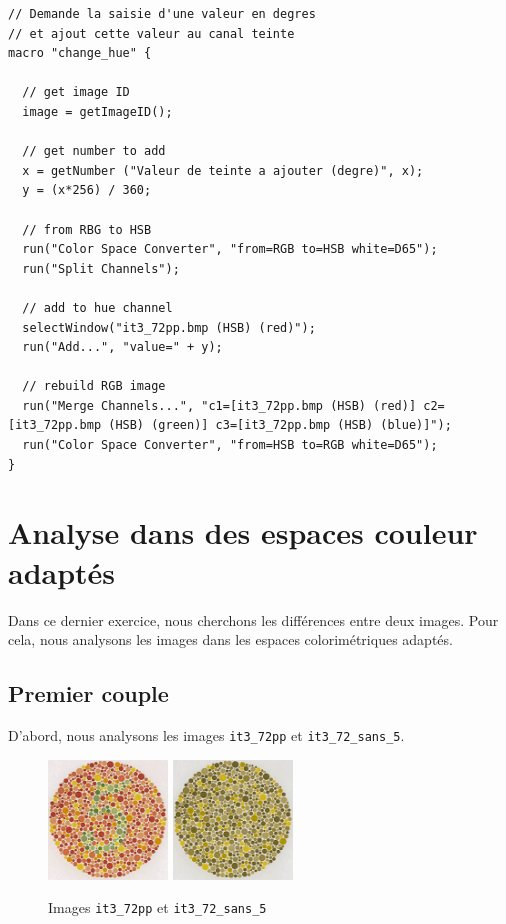 \documentclass[a4paper,11pt]{article}
\begin{document}
\begin{lstlisting}[caption=change\_hue.ijm]
// Demande la saisie d'une valeur en degres
// et ajout cette valeur au canal teinte
macro "change_hue" {

  // get image ID
  image = getImageID();

  // get number to add
  x = getNumber ("Valeur de teinte a ajouter (degre)", x);
  y = (x*256) / 360;

  // from RBG to HSB
  run("Color Space Converter", "from=RGB to=HSB white=D65");
  run("Split Channels");

  // add to hue channel
  selectWindow("it3_72pp.bmp (HSB) (red)");
  run("Add...", "value=" + y);

  // rebuild RGB image
  run("Merge Channels...", "c1=[it3_72pp.bmp (HSB) (red)] c2=[it3_72pp.bmp (HSB) (green)] c3=[it3_72pp.bmp (HSB) (blue)]");
  run("Color Space Converter", "from=HSB to=RGB white=D65");
}
\end{lstlisting}

\newpage

\section{Analyse dans des espaces couleur adaptés}

Dans ce dernier exercice, nous cherchons les différences entre deux 
images. Pour cela, nous analysons les images dans les espaces 
colorimétriques adaptés.\\

\subsection{Premier couple}

D'abord, nous analysons les images \texttt{it3\_72pp} et 
\texttt{it3\_72\_sans\_5}.

\begin{figure}[H]
  \begin{center}  
    \includegraphics[width=120px]{images/it3_72pp.png}
    \includegraphics[width=120px]{images/it3_72pp_sans_5.png}
    \caption{Images \texttt{it3\_72pp} et \texttt{it3\_72\_sans\_5}}
  \end{center}
\end{figure}
\end{document}
